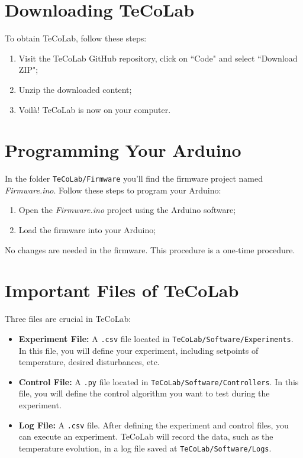 \documentclass[12pt]{report}
\begin{document}
\section{Downloading TeCoLab}

To obtain TeCoLab, follow these steps:

\begin{enumerate}
    \item Visit the TeCoLab GitHub repository, click on ``Code" and select ``Download ZIP";
    \item Unzip the downloaded content;
    \item Voilà! TeCoLab is now on your computer.
\end{enumerate}

\section{Programming Your Arduino}

In the folder \texttt{TeCoLab/Firmware} you'll find the firmware project named \emph{Firmware.ino}. Follow these steps to program your Arduino:

\begin{enumerate}
    \item Open the \emph{Firmware.ino} project using the Arduino software;
    \item Load the firmware into your Arduino;
\end{enumerate}

No changes are needed in the firmware. This procedure is a one-time procedure.

\section{Important Files of TeCoLab}

Three files are crucial in TeCoLab:

\begin{itemize}
    \item \textbf{Experiment File:} A \texttt{.csv} file located in \texttt{TeCoLab/Software/Experiments}. In this file, you will define your experiment, including setpoints of temperature, desired disturbances, etc.
    \item \textbf{Control File:} A \texttt{.py} file located in \texttt{TeCoLab/Software/Controllers}. In this file, you will define the control algorithm you want to test during the experiment.
    \item \textbf{Log File:} A \texttt{.csv} file. After defining the experiment and control files, you can execute an experiment. TeCoLab will record the data, such as the temperature evolution, in a log file saved at \texttt{TeCoLab/Software/Logs}.
\end{itemize}
\end{document}
